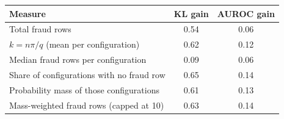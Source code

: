 \begin{tabular}{lcc}\toprule
Measure & KL gain & AUROC gain\\\midrule
Total fraud rows & 0.54 & 0.06\\
$k=n\pi/q$ (mean per configuration) & 0.62 & 0.12\\
Median fraud rows per configuration & 0.09 & 0.06\\
Share of configurations with no fraud row & 0.65 & 0.14\\
Probability mass of those configurations & 0.61 & 0.13\\
Mass-weighted fraud rows (capped at 10) & 0.63 & 0.14\\
\bottomrule\end{tabular}